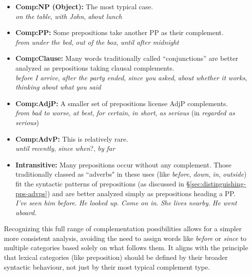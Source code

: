 \begin{itemize}
    \item \textbf{Comp:NP (Object):} The most typical case. \\ \textit{on {\ob}the table\cb}, \textit{with {\ob}John\cb}, \textit{about {\ob}lunch\cb}
    \item \textbf{Comp:PP:} Some prepositions take another PP as their complement. \\ \textit{from {\ob}under the bed\cb}, \textit{out {\ob}of the box\cb}, \textit{until {\ob}after midnight\cb}
    \item \textbf{Comp:Clause:} Many words traditionally called ``conjunctions'' are better analyzed as prepositions taking clausal complements. \\ \textit{before {\ob}I arrive\cb}, \textit{after {\ob}the party ended\cb}, \textit{since {\ob}you asked\cb}, \textit{about {\ob}whether it works\cb}, \textit{thinking about {\ob}what you said\cb}
    \item \textbf{Comp:AdjP:} A smaller set of prepositions license AdjP complements. \\ \textit{from {\ob}bad to worse\cb}, \textit{at {\ob}best\cb}, \textit{for {\ob}certain\cb}, \textit{in {\ob}short\cb}, \textit{as {\ob}serious\cb} (in \textit{regarded as serious})
    \item \textbf{Comp:AdvP:} This is relatively rare. \\ \textit{until {\ob}recently\cb}, \textit{since {\ob}when\cb}?, \textit{by {\ob}far\cb}
    \item \textbf{Intransitive:} Many prepositions occur without any complement. Those traditionally classed as ``adverbs" in these uses (like \textit{before}, \textit{down}, \textit{in}, \textit{outside}) fit the syntactic patterns of prepositions (as discussed in \S\ref{sec:distinguishing-pps-advps}) and are better analyzed simply as prepositions heading a PP. \\ \textit{I've seen him {\ob}before\cb}. \textit{He looked {\ob}up\cb}. \textit{Come {\ob}on in\cb}. \textit{She lives {\ob}nearby\cb}. \textit{He went {\ob}aboard\cb}.
\end{itemize}

Recognizing this full range of complementation possibilities allows for a simpler more consistent analysis, avoiding the need to assign words like \textit{before} or \textit{since} to multiple categories based solely on what follows them. It aligns with the principle that lexical categories (like preposition) should be defined by their broader syntactic behaviour, not just by their most typical complement type.

